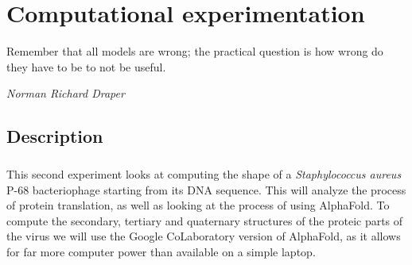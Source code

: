 \chapter{Computational experimentation}
\epigraph{Remember that all models are wrong; the practical question is how wrong do they have to be to not be useful.}{\textit{Norman Richard Draper}}
\section{Description}
\paragraph{}This second experiment looks at computing the shape of a \emph{Staphylococcus aureus} P-68 bacteriophage starting from its DNA sequence. This will analyze the process of protein translation, as well as looking at the process of using AlphaFold\cite{jumperHighlyAccurateProtein2021}. To compute the secondary, tertiary and quaternary structures of the proteic parts of the virus we will use the Google CoLaboratory version of AlphaFold\cite{GoogleColaboratoryAlpha1970}, as it allows for far more computer power than available on a simple laptop.
